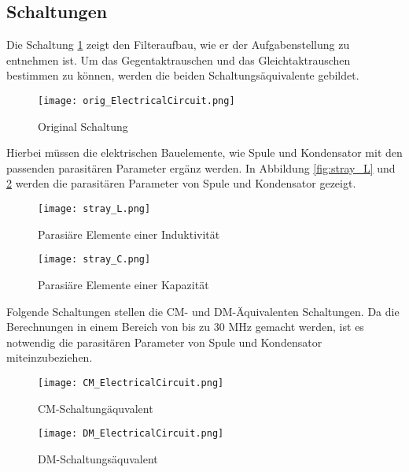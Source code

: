 \subsection{Schaltungen} \label{subsec:schaltungen}
Die Schaltung \ref{fig:orig_Schaltung}  zeigt den Filteraufbau, wie er der Aufgabenstellung zu entnehmen ist. Um das Gegentaktrauschen und das Gleichtaktrauschen bestimmen zu können, werden die beiden Schaltungsäquivalente gebildet. 
\begin{figure}[H]
	\centering
	\texttt{[image: orig\_ElectricalCircuit.png]}
	\caption{Original Schaltung}
	\label{fig:orig_Schaltung}
\end{figure}
Hierbei müssen die elektrischen Bauelemente, wie Spule und Kondensator mit den passenden parasitären Parameter ergänz werden. In Abbildung \ref{fig:stray_L} und \ref{fig:stray_C} werden die parasitären Parameter von Spule und Kondensator gezeigt.
\begin{figure}[H]
	\begin{minipage}[h]{0.45\linewidth}
		\centering
		\texttt{[image: stray\_L.png]}
		\label{fig:stray_L}
		\caption{Parasiäre Elemente einer Induktivität}
	\end{minipage}
	\begin{minipage}[h]{0.45\linewidth}
		\centering
		\texttt{[image: stray\_C.png]}
		\label{fig:stray_C}
		\caption{Parasiäre Elemente einer Kapazität}
	\end{minipage}
\end{figure}
Folgende Schaltungen stellen die CM- und DM-Äquivalenten Schaltungen. Da die Berechnungen in einem Bereich von bis zu 30 MHz gemacht werden, ist es notwendig die parasitären Parameter von Spule und Kondensator miteinzubeziehen.

\begin{figure}[H]
	\centering
	\texttt{[image: CM\_ElectricalCircuit.png]}
	\caption{CM-Schaltungäquvalent}
	\label{fig:CM-Schaltungäquivalent}
\end{figure}

\begin{figure}[H]
	\centering
	\texttt{[image: DM\_ElectricalCircuit.png]}
	\caption{DM-Schaltungsäquvalent}
	\label{fig:DM-Schaltungsäquivalent}
\end{figure}
\newpage
